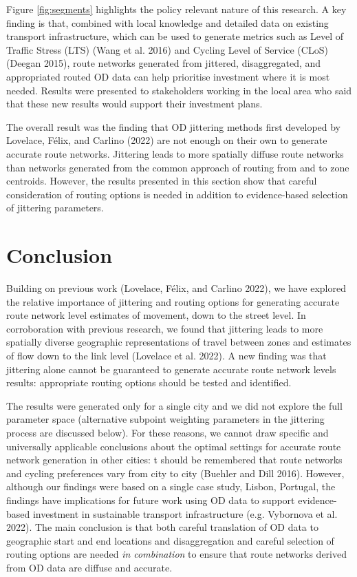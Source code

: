 \documentclass{isprs} %
\begin{document}
Figure \ref{fig:segments} highlights the policy relevant nature of this research.
A key finding is that, combined with local knowledge and detailed data on existing transport infrastructure, which can be used to generate metrics such as Level of Traffic Stress (LTS) (Wang et al. 2016) and Cycling Level of Service (CLoS) (Deegan 2015), route networks generated from jittered, disaggregated, and appropriated routed OD data can help prioritise investment where it is most needed.
Results were presented to stakeholders working in the local area who said that these new results would support their investment plans.

The overall result was the finding that OD jittering methods first developed by Lovelace, Félix, and Carlino (2022) are not enough on their own to generate accurate route networks.
Jittering leads to more spatially diffuse route networks than networks generated from the common approach of routing from and to zone centroids.
However, the results presented in this section show that careful consideration of routing options is needed in addition to evidence-based selection of jittering parameters.

\hypertarget{conclusion}{%
\section{Conclusion}\label{conclusion}}

Building on previous work (Lovelace, Félix, and Carlino 2022), we have explored the relative importance of jittering and routing options for generating accurate route network level estimates of movement, down to the street level.
In corroboration with previous research, we found that jittering leads to more spatially diverse geographic representations of travel between zones and estimates of flow down to the link level (Lovelace et al. 2022).
A new finding was that jittering alone cannot be guaranteed to generate accurate route network levels results: appropriate routing options should be tested and identified.

The results were generated only for a single city and we did not explore the full parameter space (alternative subpoint weighting parameters in the jittering process are discussed below).
For these reasons, we cannot draw specific and universally applicable conclusions about the optimal settings for accurate route network generation in other cities: t should be remembered that route networks and cycling preferences vary from city to city (Buehler and Dill 2016).
However, although our findings were based on a single case study, Lisbon, Portugal, the findings have implications for future work using OD data to support evidence-based investment in sustainable transport infrastructure (e.g. Vybornova et al. 2022).
The main conclusion is that both careful translation of OD data to geographic start and end locations and disaggregation and careful selection of routing options are needed \emph{in combination} to ensure that route networks derived from OD data are diffuse and accurate.
\end{document}
